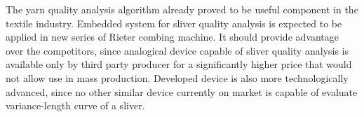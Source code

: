 \documentclass[twoside]{ctuthesis}
\theoremstyle{plain}
\theoremstyle{definition}
\theoremstyle{note}
\begin{document}
The yarn quality analysis algorithm already proved to be useful component in the textile industry. Embedded system for sliver quality analysis is  expected to be applied in new series of Rieter combing machine. It should provide advantage over the competitors, since analogical device capable of sliver quality analysis is available only by third party producer for a significantly higher price that would not allow use in mass production. Developed device is also more technologically advanced, since no other similar device currently on market is capable of evaluate variance-length curve of a sliver.


\appendix

\printindex

\appendix

%



\end{document}
